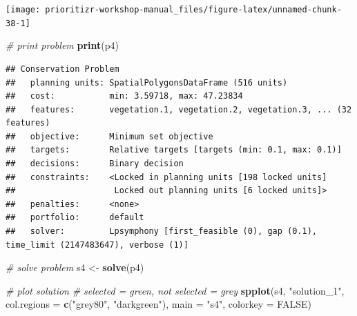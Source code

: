 \documentclass[
  12pt,
]{book}
\newenvironment{Shaded}{\begin{snugshade}}{\end{snugshade}}
\newcommand{\CommentTok}[1]{\textcolor[rgb]{0.56,0.35,0.01}{\textit{#1}}}
\newcommand{\DataTypeTok}[1]{\textcolor[rgb]{0.13,0.29,0.53}{#1}}
\newcommand{\FloatTok}[1]{\textcolor[rgb]{0.00,0.00,0.81}{#1}}
\newcommand{\KeywordTok}[1]{\textcolor[rgb]{0.13,0.29,0.53}{\textbf{#1}}}
\newcommand{\NormalTok}[1]{#1}
\newcommand{\OperatorTok}[1]{\textcolor[rgb]{0.81,0.36,0.00}{\textbf{#1}}}
\newcommand{\OtherTok}[1]{\textcolor[rgb]{0.56,0.35,0.01}{#1}}
\newcommand{\StringTok}[1]{\textcolor[rgb]{0.31,0.60,0.02}{#1}}
\begin{document}
\begin{center}\texttt{[image: prioritizr-workshop-manual\_files/figure-latex/unnamed-chunk-38-1]} \end{center}

\begin{Shaded}
\end{Shaded}

\begin{Shaded}
\begin{Highlighting}[]
\CommentTok{# print problem}
\KeywordTok{print}\NormalTok{(p4)}
\end{Highlighting}
\end{Shaded}

\begin{verbatim}
## Conservation Problem
##   planning units: SpatialPolygonsDataFrame (516 units)
##   cost:           min: 3.59718, max: 47.23834
##   features:       vegetation.1, vegetation.2, vegetation.3, ... (32 features)
##   objective:      Minimum set objective 
##   targets:        Relative targets [targets (min: 0.1, max: 0.1)]
##   decisions:      Binary decision 
##   constraints:    <Locked in planning units [198 locked units]
##                    Locked out planning units [6 locked units]>
##   penalties:      <none>
##   portfolio:      default
##   solver:         Lpsymphony [first_feasible (0), gap (0.1), time_limit (2147483647), verbose (1)]
\end{verbatim}

\begin{Shaded}
\begin{Highlighting}[]
\CommentTok{# solve problem}
\NormalTok{s4 <-}\StringTok{ }\KeywordTok{solve}\NormalTok{(p4)}

\CommentTok{# plot solution}
\CommentTok{# selected = green, not selected = grey}
\KeywordTok{spplot}\NormalTok{(s4, }\StringTok{"solution_1"}\NormalTok{, }\DataTypeTok{col.regions =} \KeywordTok{c}\NormalTok{(}\StringTok{"grey80"}\NormalTok{, }\StringTok{"darkgreen"}\NormalTok{), }\DataTypeTok{main =} \StringTok{"s4"}\NormalTok{,}
       \DataTypeTok{colorkey =} \OtherTok{FALSE}\NormalTok{)}
\end{Highlighting}
\end{Shaded}
\end{document}
